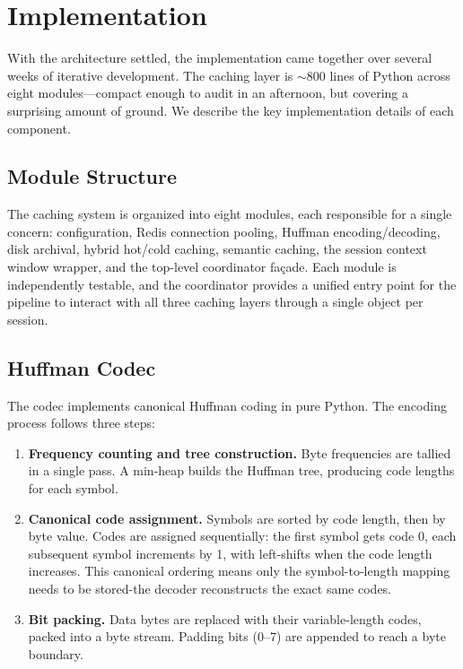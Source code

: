 \documentclass[conference]{IEEEtran}
\begin{document}
\section{Implementation}
\label{sec:implementation}

With the architecture settled, the implementation came together over several weeks of iterative development. The caching layer is ${\sim}800$ lines of Python across eight modules---compact enough to audit in an afternoon, but covering a surprising amount of ground. We describe the key implementation details of each component.

\subsection{Module Structure}

The caching system is organized into eight modules, each responsible for a single concern: configuration, Redis connection pooling, Huffman encoding/decoding, disk archival, hybrid hot/cold caching, semantic caching, the session context window wrapper, and the top-level coordinator fa\c{c}ade. Each module is independently testable, and the coordinator provides a unified entry point for the pipeline to interact with all three caching layers through a single object per session.

\subsection{Huffman Codec}

The codec implements canonical Huffman coding in pure Python. The encoding process follows three steps:

\begin{enumerate}
\item \textbf{Frequency counting and tree construction.} Byte frequencies are tallied in a single pass. A min-heap builds the Huffman tree, producing code lengths for each symbol.

\item \textbf{Canonical code assignment.} Symbols are sorted by code length, then by byte value. Codes are assigned sequentially: the first symbol gets code 0, each subsequent symbol increments by 1, with left-shifts when the code length increases. This canonical ordering means only the symbol-to-length mapping needs to be stored-the decoder reconstructs the exact same codes.

\item \textbf{Bit packing.} Data bytes are replaced with their variable-length codes, packed into a byte stream. Padding bits (0--7) are appended to reach a byte boundary.
\end{enumerate}
\end{document}
